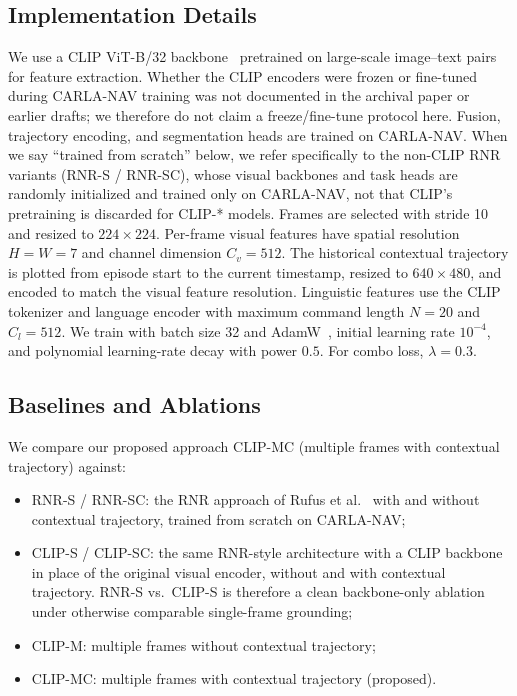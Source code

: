 \subsection{Implementation Details}

We use a CLIP ViT-B/32 backbone~\cite{radford2021learning} pretrained on large-scale image--text pairs for feature extraction. Whether the CLIP encoders were frozen or fine-tuned during CARLA-NAV training was not documented in the archival paper or earlier drafts; we therefore do not claim a freeze/fine-tune protocol here. Fusion, trajectory encoding, and segmentation heads are trained on CARLA-NAV. When we say ``trained from scratch'' below, we refer specifically to the non-CLIP RNR variants (RNR-S / RNR-SC), whose visual backbones and task heads are randomly initialized and trained only on CARLA-NAV, not that CLIP's pretraining is discarded for CLIP-* models. Frames are selected with stride 10 and resized to $224 \times 224$. Per-frame visual features have spatial resolution $H=W=7$ and channel dimension $C_v=512$. The historical contextual trajectory is plotted from episode start to the current timestamp, resized to $640 \times 480$, and encoded to match the visual feature resolution. Linguistic features use the CLIP tokenizer and language encoder with maximum command length $N=20$ and $C_l=512$. We train with batch size 32 and AdamW~\cite{loshchilov2017decoupled}, initial learning rate $10^{-4}$, and polynomial learning-rate decay with power $0.5$. For combo loss, $\lambda = 0.3$.

\subsection{Baselines and Ablations}

We compare our proposed approach CLIP-MC (multiple frames with contextual trajectory) against:
\begin{itemize}
    \item RNR-S / RNR-SC: the RNR approach of Rufus et al.~\cite{Rufus_2021} with and without contextual trajectory, trained from scratch on CARLA-NAV;
    \item CLIP-S / CLIP-SC: the same RNR-style architecture with a CLIP backbone in place of the original visual encoder, without and with contextual trajectory. RNR-S vs.\ CLIP-S is therefore a clean backbone-only ablation under otherwise comparable single-frame grounding;
    \item CLIP-M: multiple frames without contextual trajectory;
    \item CLIP-MC: multiple frames with contextual trajectory (proposed).
\end{itemize}

